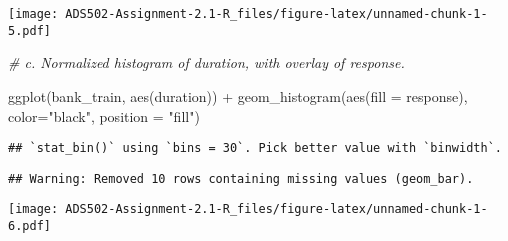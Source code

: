 \documentclass[
]{article}
\newenvironment{Shaded}{\begin{snugshade}}{\end{snugshade}}
\newcommand{\AttributeTok}[1]{\textcolor[rgb]{0.77,0.63,0.00}{#1}}
\newcommand{\CommentTok}[1]{\textcolor[rgb]{0.56,0.35,0.01}{\textit{#1}}}
\newcommand{\ConstantTok}[1]{\textcolor[rgb]{0.00,0.00,0.00}{#1}}
\newcommand{\DecValTok}[1]{\textcolor[rgb]{0.00,0.00,0.81}{#1}}
\newcommand{\FunctionTok}[1]{\textcolor[rgb]{0.00,0.00,0.00}{#1}}
\newcommand{\NormalTok}[1]{#1}
\newcommand{\OtherTok}[1]{\textcolor[rgb]{0.56,0.35,0.01}{#1}}
\newcommand{\SpecialCharTok}[1]{\textcolor[rgb]{0.00,0.00,0.00}{#1}}
\newcommand{\StringTok}[1]{\textcolor[rgb]{0.31,0.60,0.02}{#1}}
\begin{document}
\texttt{[image: ADS502-Assignment-2.1-R\_files/figure-latex/unnamed-chunk-1-5.pdf]}

\begin{Shaded}
\begin{Highlighting}[]
\CommentTok{\# c. Normalized histogram of duration, with overlay of response.}

\FunctionTok{ggplot}\NormalTok{(bank\_train, }\FunctionTok{aes}\NormalTok{(duration)) }\SpecialCharTok{+} \FunctionTok{geom\_histogram}\NormalTok{(}\FunctionTok{aes}\NormalTok{(}\AttributeTok{fill =}\NormalTok{ response), }\AttributeTok{color=}\StringTok{"black"}\NormalTok{,}
                 \AttributeTok{position =} \StringTok{"fill"}\NormalTok{)}
\end{Highlighting}
\end{Shaded}

\begin{verbatim}
## `stat_bin()` using `bins = 30`. Pick better value with `binwidth`.
\end{verbatim}

\begin{verbatim}
## Warning: Removed 10 rows containing missing values (geom_bar).
\end{verbatim}

\texttt{[image: ADS502-Assignment-2.1-R\_files/figure-latex/unnamed-chunk-1-6.pdf]}

\begin{Shaded}
\end{Shaded}
\end{document}
